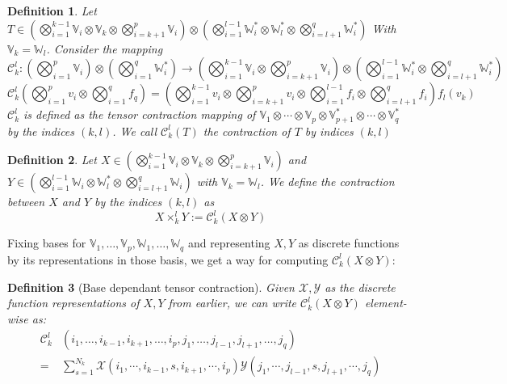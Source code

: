 \documentclass[11pt,a4paper,openright,oneside]{book}
\numberwithin{equation}{section}
\newtheorem{defn0}{Definition}[chapter]
\newenvironment{definition}{ \begin{defn0}}{\end{defn0}}
\begin{document}
\begin{definition}
    Let $T \in \left( \bigotimes_{i=1}^{k-1} \mathbb{V}_i \otimes \mathbb{V}_k \otimes \bigotimes_{i=k+1}^{p} \mathbb{V}_i \right) \otimes 
    \left( \bigotimes_{i=1}^{l-1} \mathbb{W}_{i}^* \otimes \mathbb{W}_l^* \otimes 
    \bigotimes_{i=l+1}^q \mathbb{W}_i^* \right)$ With $\mathbb{V}_k = \mathbb{W}_l$. Consider the mapping
    $$
    \mathcal{C}_k^l: 
    \left(\bigotimes_{i=1}^{p} \mathbb{V}_i \right) \otimes \left( \bigotimes_{i=1}^{q} \mathbb{W}_i^* \right) \longrightarrow 
    \left( \bigotimes_{i=1}^{k-1} \mathbb{V}_i \otimes \bigotimes_{i=k+1}^p \mathbb{V}_i \right) \otimes \left( \bigotimes_{i=1}^{l-1} \mathbb{W}^*_i \otimes \bigotimes_{i=l+1}^q \mathbb{W}^*_i \right)
$$
$$
\mathcal{C}_k^l \left( \bigotimes\nolimits_{i=1}^p v_i \otimes \bigotimes\nolimits_{i=1}^q f_q \right) 
= \left(\bigotimes\nolimits_{i=1}^{k-1} v_i \otimes \bigotimes\nolimits_{i=k+1}^p v_{i} \otimes
    \bigotimes\nolimits_{i=1}^{l-1} f_i \otimes \bigotimes_{i=l+1}^q f_i \right) f_l(v_k)$$
$\mathcal{C}_k^l$ is defined as the tensor contraction mapping of $\mathbb{V}_1 \otimes \cdots \otimes \mathbb{V}_p \otimes \mathbb{V}_{p+1}^* \otimes
\cdots \otimes \mathbb{V}_q^*$ by the indices $(k,l)$. We call $\mathcal{C}_k^l(T)$ the contraction of $T$ by indices $(k,l)$
\end{definition}

\begin{definition}

    Let $X \in \left( \bigotimes_{i=1}^{k-1} \mathbb{V}_i \otimes \mathbb{V}_k \otimes \bigotimes_{i=k+1}^{p} \mathbb{V}_i \right)$ and
    $Y \in \left( \bigotimes_{i=1}^{l-1} \mathbb{W}_{i} \otimes \mathbb{W}_l^* \otimes 
    \bigotimes_{i=l+1}^q \mathbb{W}_i \right)$ with $\mathbb{V}_k = \mathbb{W}_l$. We define the contraction between $X$ and $Y$ by the
    indices $(k,l)$ as $$X \times^l_k Y := \mathcal{C}_k^l(X \otimes Y)$$
\end{definition}

Fixing bases for $\mathbb{V}_1, \dots, \mathbb{V}_p, \mathbb{W}_1, \dots, \mathbb{W}_q$ and representing $X, Y$
as discrete functions by its representations in those basis, we get a way for computing $\mathcal{C}_k^l(X \otimes Y)$:

\begin{definition}[Base dependant tensor contraction]
     Given $\mathcal{X}, \mathcal{Y}$ as the discrete function representations
    of $X, Y$ from earlier, we can write $\mathcal{C}_k^l(X \otimes Y)$ element-wise as:
    $$\begin{align}\mathcal{C}_k^l & (i_1, \dots, i_{k-1}, i_{k+1}, \dots, i_p, j_1, \dots, j_{l-1}, j_{l+1}, \dots, j_q) \\  =& \sum_{s=1}^{N_k}
        \mathcal{X}(i_1, \cdots, i_{k-1}, s, i_{k+1}, \cdots, i_p) \mathcal{Y}(j_1, \cdots, j_{l-1}, s, j_{l+1}, \cdots, j_q)
\end{align}$$
    \end{definition}
\end{document}
